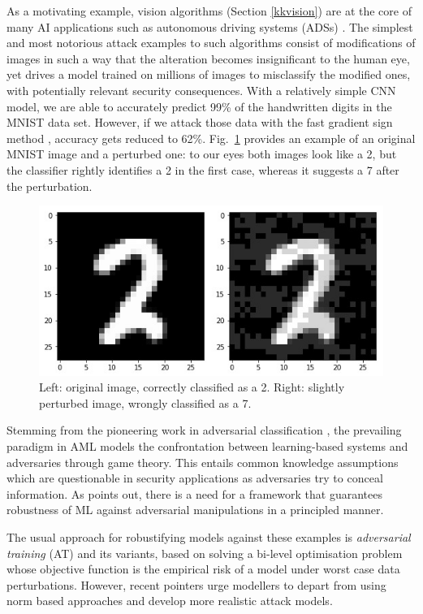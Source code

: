 As a motivating example, vision algorithms (Section
\ref{kkvision}) are at the core of many AI 
applications such as autonomous driving systems (ADSs) \parencite{rumanos}. 
The simplest and most notorious attack examples to
such algorithms  
consist of modifications of images in such a way that the alteration becomes insignificant to the human eye, yet drives a model trained on millions of images to misclassify the modified ones,
with potentially relevant security consequences.
With a relatively simple CNN model, we are able to accurately predict 99\% of the handwritten digits in the MNIST data set.
However, if we attack those data with the fast gradient sign method \parencite{szegedy2013intriguin},
accuracy gets reduced to 62\%. Fig.~\ref{fig:digits} provides an example of an original MNIST image and a perturbed one: to our eyes both images look like a 2, but the classifier rightly identifies a 2 in the first case, whereas it suggests a 7 after the perturbation. 
%
%
%
\begin{figure}[hbt]
\centering
  \includegraphics[width=.6\linewidth]{figures/27}
  \caption{Left: original image, correctly classified as a 2. Right: slightly perturbed image, wrongly classified as a 7.}
  \label{fig:digits}
\end{figure}
Stemming from the pioneering work in adversarial classification 
\parencite{dalvi2004adversarial}, the prevailing paradigm in AML models
the confrontation between learning-based systems and adversaries through game theory. 
This entails common knowledge assumptions 
\parencite{hargreaves2004game} which are 
questionable in security 
applications as adversaries try to conceal information. 
As \parencite{fan2019selective} points out, there is a need for a  framework that guarantees robustness of ML against adversarial manipulations in a principled manner. 

The usual approach for robustifying models against these examples is {\em adversarial training} (AT) \parencite{madry2018towards} and its 
variants, based on solving a 
bi-level optimisation problem whose objective function is the empirical risk of a model under worst case data perturbations. %
However, recent pointers urge modellers to depart from using 
norm based approaches \parencite{carlini2019evaluating} and develop more realistic attack models.

